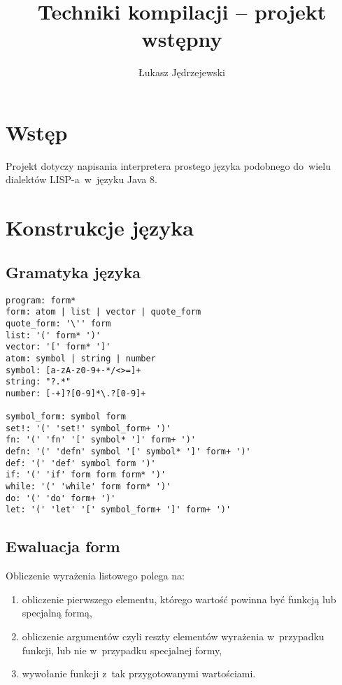 \documentclass[a4paper,11pt]{article}
\author{Łukasz Jędrzejewski}
\title{Techniki kompilacji -- projekt wstępny}
\date{}
\begin{document}
\maketitle

\section{Wstęp}

Projekt dotyczy napisania interpretera prostego języka podobnego do~wielu
dialektów LISP-a~w~języku Java 8.

\section{Konstrukcje języka}

\subsection{Gramatyka języka}

\begin{verbatim}
program: form*
form: atom | list | vector | quote_form
quote_form: '\'' form
list: '(' form* ')'
vector: '[' form* ']'
atom: symbol | string | number
symbol: [a-zA-z0-9+-*/<>=]+
string: "?.*"
number: [-+]?[0-9]*\.?[0-9]+

symbol_form: symbol form
set!: '(' 'set!' symbol_form+ ')'
fn: '(' 'fn' '[' symbol* ']' form+ ')'
defn: '(' 'defn' symbol '[' symbol* ']' form+ ')'
def: '(' 'def' symbol form ')'
if: '(' 'if' form form form* ')'
while: '(' 'while' form form* ')'
do: '(' 'do' form+ ')'
let: '(' 'let' '[' symbol_form+ ']' form+ ')'
\end{verbatim}

\subsection{Ewaluacja form}

Obliczenie wyrażenia listowego polega na:
\begin{enumerate}
\item obliczenie pierwszego elementu, którego wartość powinna być funkcją lub
  specjalną formą,
\item obliczenie argumentów czyli reszty elementów wyrażenia w~przypadku
  funkcji, lub nie w~przypadku specjalnej formy,
\item wywołanie funkcji z~tak przygotowanymi wartościami.
\end{enumerate}
\end{document}
